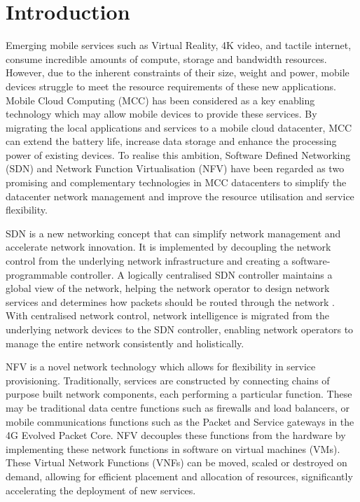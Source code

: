 
\section{Introduction}
\label{sec:introduction}

Emerging mobile services such as Virtual Reality, 4K video, and tactile internet, consume incredible amounts of compute, storage and bandwidth resources\cite{AndrewsBCHLSZ14}. However, due to the inherent constraints of their size, weight and power, mobile devices struggle to meet the resource requirements of these new applications. Mobile Cloud Computing (MCC) \cite{LiSHGXX18} \cite{RahimiVMV18} has been considered as a key enabling technology which may allow mobile devices to provide these services. By migrating the local applications and services to a mobile cloud datacenter, MCC can extend the battery life, increase data storage and enhance the processing power of existing devices. To realise this ambition, Software Defined Networking (SDN) and Network Function Virtualisation (NFV) have been regarded as two promising and complementary technologies in MCC datacenters to simplify the datacenter network management and improve the resource utilisation and service flexibility. 

SDN is a new networking concept that can simplify network management and accelerate network innovation. It is implemented by decoupling the network control from the underlying network infrastructure and creating a software-programmable controller. A logically centralised SDN controller maintains a global view of the network, helping the network operator to design network services and determines how packets should be routed through the network \cite{KimF13} \cite{HaresW13}. With centralised network control, network intelligence is migrated from the underlying network devices to the SDN controller, enabling network operators to manage the entire network consistently and holistically. 

NFV is a novel network technology which allows for flexibility in service provisioning. Traditionally, services are constructed by connecting chains of purpose built network components, each performing a particular function. These may be traditional data centre functions such as firewalls and load balancers, or mobile communications functions such as the Packet and Service gateways in the 4G Evolved Packet Core. NFV decouples these functions from the hardware by implementing these network functions in software on virtual machines (VMs). These Virtual Network Functions (VNFs) can be moved, scaled or destroyed on demand, allowing for efficient placement and allocation of resources, significantly accelerating the deployment of new services. 

